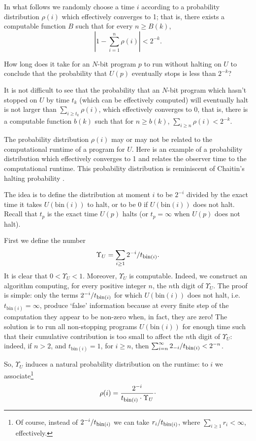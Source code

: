 \documentclass[12pt,twoside,openright]{report}
\newcommand{\bin}{\mbox{bin}}
\newcommand{\fbin}{\mbox{\rm \footnotesize{bin}}}
\begin{document}
In what follows we randomly choose a time $i$ according to a probability distribution $\rho(i)$ which effectively converges to 1; that is, there exists a computable function $B$ such that for every $n\ge B(k)$, $$|1-\sum_{i=1}^{n}\rho(i)|< 2^{-k}.$$  

How long does it take for an $N$-bit program $p$ to run without halting on $U$ to conclude that the probability that $U(p)$ eventually stops is less than $2^{-k}$?
 
It is not difficult to see that the probability that an $N$-bit program which hasn't stopped on $U$ by time $t_{k}$ (which can be effectively computed) will eventually halt is not larger than $\sum_{i\ge t_{k}} \rho(i)$, which effectively converges to 0, that is, there is a computable function $b(k)$ such that for $n\ge b(k)$, $\sum_{i\ge n} \rho(i) < 2^{-k}$.
   
The probability distribution $\rho(i)$ may or may not be related to the computational runtime of a program for $U$. Here is an example of a probability distribution which effectively converges to 1 and relates the observer time to the computational runtime. This probability distribution is reminiscent of Chaitin's halting probability \cite{Calude}.

The idea is to define the distribution at moment $i$ to be $2^{-i}$ divided by the exact time it takes $U(\bin(i))$ to halt, or to be 0 if $U(\bin(i))$ does not halt.  Recall that $t_{p}$ is the exact time $U(p)$ halts (or $t_{p}=\infty$ when $U(p)$ does not halt). 

First we define the number
\[\Upsilon_{U}=\sum_{i\ge 1}2^{-i}/t_{\fbin(i)}. \]
It is clear that $0<\Upsilon_{U}<1$. Moreover,  $\Upsilon_{U}$ is computable.  Indeed, we construct an algorithm computing, for every positive integer $n$, the $n$th digit of $\Upsilon_{U}.$ The proof is simple: only the terms $2^{-i}/t_{\fbin(i)}$ for which $U(\bin(i))$ does not halt, i.e.\ $t_{\bin(i)}=\infty$,  produce `false' information because at every finite step of the computation they appear to be non-zero when, in fact, they are zero! The solution is to run all non-stopping programs $U(\bin(i))$ for enough time such that their cumulative contribution is too small to affect the $n$th digit of $\Upsilon_{U}$: indeed, if $n>2$, and $t_{\bin(i)}= 1$, for $i\ge n$, then $\sum_{i=n}^{\infty} 2_{-i}/t_{\fbin(i)}< 2^{-n}$.
 

So,  $\Upsilon_{U}$  induces a natural probability distribution on the runtime: to $i$ we associate\footnote{Of course, instead of $2^{-i}/t_{\fbin(i)}$ we can take $r_i/t_{\fbin(i)}$, where $\sum_{i\ge 1}r_i <\infty$, effectively.}
\begin{equation}
\label{timed}
\rho(i)= \frac{2^{-i}}{t_{\fbin(i)}\cdot \Upsilon_{U}}\raisebox{0.5ex}.
\end{equation}
\end{document}
